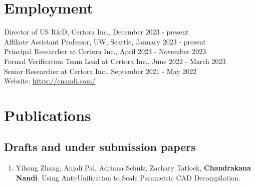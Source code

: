 \documentclass[margin, 10pt]{res} %
\begin{document}
\begin{resume}


\section{Employment}

Director of US R\&D, Certora Inc., December 2023 - present \\
Affiliate Assistant Professor, UW, Seattle, January 2023 - present \\

Principal Researcher at Certora Inc., April 2023 - November 2023 \\
Formal Verification Team Lead at Certora Inc., June 2022 - March 2023 \\
Senior Researcher at Certora Inc., September 2021 - May 2022 \\
Website: \url{https://cnandi.com/} \\

\section{Publications}
\subsection{Drafts and under submission papers}
\begin{enumerate}

  \item Yihong Zhang, Anjali Pal, Adriana Schulz, Zachary Tatlock, \textbf{Chandrakana Nandi}.
    Using Anti-Unification to Scale Parametric CAD Decompilation.


\end{enumerate}
\end{resume}
\end{document}
